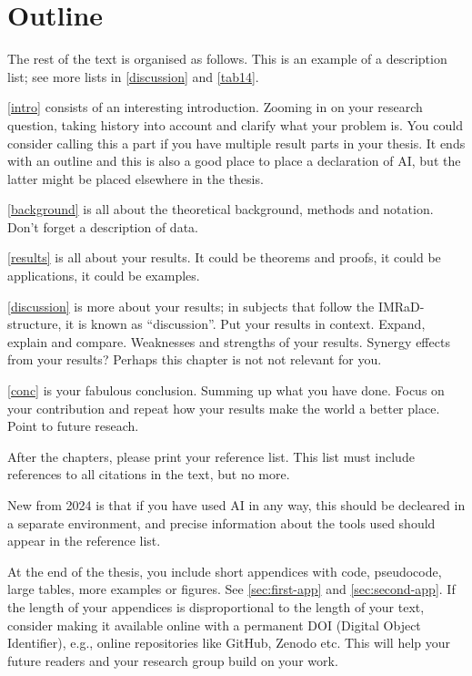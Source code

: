 \section{Outline}

The rest of the text is organised as follows. This is an example of a description list; see more lists in \cref{discussion} and \vref{tab14}.

\cref{intro} consists of an interesting introduction. Zooming in on your research question, taking history into account and clarify what your problem is. You could consider calling this a part if you have multiple result parts in your thesis. It ends with an outline and this is also a good place to place a declaration of AI, but the latter might be placed elsewhere in the thesis.

\cref{background} is all about the theoretical background, methods and notation. Don't forget a description of data. 

\cref{results} is all about your results. It could be theorems and proofs, it could be applications, it could be examples.

\cref{discussion} is more about your results; in subjects that follow the IMRaD-structure, it is known as \enquote{discussion}. Put your results in context. Expand, explain and compare. Weaknesses and strengths of your results. Synergy effects from your results?  Perhaps this chapter is not not relevant for you.

\cref{conc} is your fabulous conclusion. Summing up what you have done. Focus on your contribution and repeat how your results make the world a better place. Point to future reseach.

After the chapters, please print your reference list. This list must include references to all citations in the text, but no more. 

New from 2024 is that if you have used AI in any way, this should be decleared in a separate environment, and precise information about the tools used should appear in the reference list.

 At the end of the thesis, you include short appendices with code, pseudocode, large tables, more examples or figures. See \cref{sec:first-app} and \cref{sec:second-app}. If the length of your appendices is disproportional to the length of your text, consider making it available online with a permanent DOI (Digital Object Identifier), e.g., online repositories like GitHub, Zenodo etc. This will help your future readers and your research group build on your work.

